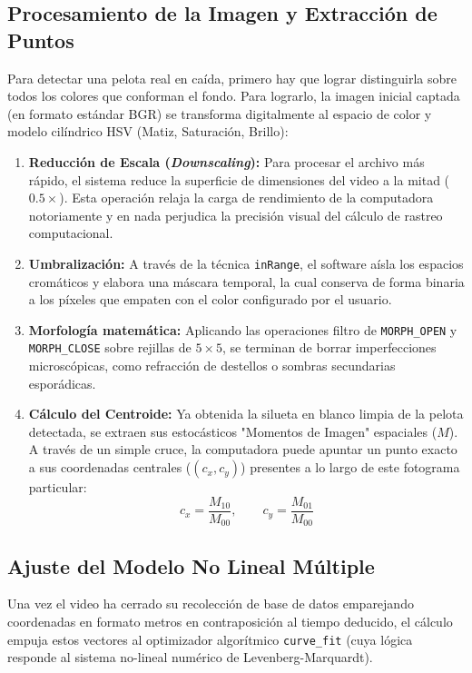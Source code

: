 \documentclass[12pt,a4paper]{article}
\begin{document}
\subsection{Procesamiento de la Imagen y Extracción de Puntos}
Para detectar una pelota real en caída, primero hay que lograr distinguirla sobre todos los colores que conforman el fondo. Para lograrlo, la imagen inicial captada (en formato estándar BGR) se transforma digitalmente al espacio de color y modelo cilíndrico HSV (Matiz, Saturación, Brillo):

\begin{enumerate}
    \item \textbf{Reducción de Escala (\textit{Downscaling}):} Para procesar el archivo más rápido, el sistema reduce la superficie de dimensiones del video a la mitad ($0.5\times$). Esta operación relaja la carga de rendimiento de la computadora notoriamente y en nada perjudica la precisión visual del cálculo de rastreo computacional.
    \item \textbf{Umbralización:} A través de la técnica \texttt{inRange}, el software aísla los espacios cromáticos y elabora una máscara temporal, la cual conserva de forma binaria a los píxeles que empaten con el color configurado por el usuario.
    \item \textbf{Morfología matemática:} Aplicando las operaciones filtro de \texttt{MORPH\_OPEN} y \texttt{MORPH\_CLOSE} sobre rejillas de $5\times 5$, se terminan de borrar imperfecciones microscópicas, como refracción de destellos o sombras secundarias esporádicas.
    \item \textbf{Cálculo del Centroide:} Ya obtenida la silueta en blanco limpia de la pelota detectada, se extraen sus estocásticos "Momentos de Imagen" espaciales ($M$). A través de un simple cruce, la computadora puede apuntar un punto exacto a sus coordenadas centrales ($(c_x, c_y)$) presentes a lo largo de este fotograma particular:
    $$ c_x = \frac{M_{10}}{M_{00}}, \quad\quad c_y = \frac{M_{01}}{M_{00}} $$
\end{enumerate}

\subsection{Ajuste del Modelo No Lineal Múltiple}
Una vez el video ha cerrado su recolección de base de datos emparejando coordenadas en formato metros en contraposición al tiempo deducido, el cálculo empuja estos vectores al optimizador algorítmico \texttt{curve\_fit} (cuya lógica responde al sistema no-lineal numérico de Levenberg-Marquardt).
\end{document}
